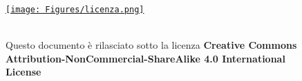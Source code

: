 \documentclass[
11pt, %
italian, 
singlespacing, %
headsepline, %
]{MastersDoctoralThesis} %
\theoremstyle{plain}
\theoremstyle{definition}
\theoremstyle{remark}
\begin{document}
\mainmatter %

\pagestyle{thesis} %












\appendix


\newpage
\thispagestyle{empty}  %


\vspace{10cm}

\begin{figure}[b]
    \centering
    \href{https://creativecommons.org/licenses/by-nc-sa/4.0/}{
        \texttt{[image: Figures/licenza.png]} %
    }

    \vspace{0.5cm} %
    \parbox{\textwidth}{\\Questo documento è rilasciato sotto la licenza \textbf{Creative Commons Attribution-NonCommercial-ShareAlike 4.0 International License}}
\end{figure}
\end{document}
